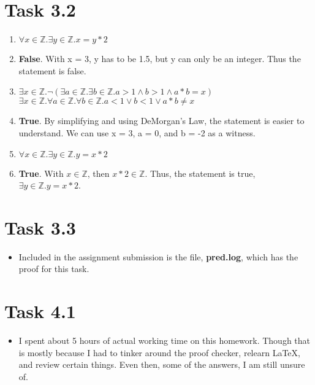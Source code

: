 \documentclass{article}
\newcommand{\Z}{\mathbb{Z}}
\newcommand{\answer}{\item[]} %
\begin{document}
	\section{Task 3.2}
		\begin{enumerate}[label = {(\alph*)}]
			
			\item $\forall x \in \Z . \exists y \in \Z . x = y * 2$
			\answer \textbf{False}. With x = 3, y has to be 1.5, but y can only be an integer. Thus the statement is false.
			
			\item $\exists x \in \Z . \neg(\exists a \in \Z . \exists b \in \Z . a > 1 \land b > 1 \land a * b = x)$
			\newline
			$\exists x \in \Z . \forall a \in \Z . \forall b \in \Z . a < 1 \lor b < 1 \lor a * b \neq x$
			\answer \textbf{True}. By simplifying and using DeMorgan's Law, the statement is easier to understand. We can use x = 3, a = 0, and b = -2 as a witness. 
			
			\item $\forall x \in \Z . \exists y \in \Z . y = x * 2$
			\answer \textbf{True}. With $x \in \Z$, then $x * 2 \in \Z$. Thus, the statement is true, $\exists y \in \Z . y = x * 2$.
			
		\end{enumerate}
	
	\section{Task 3.3}
		\begin{itemize}
			
			\answer Included in the assignment submission is the file, \textbf{pred.log}, which has the proof for this task.
			
		\end{itemize}
	
	\section{Task 4.1}
		\begin{itemize}
			
			\answer I spent about 5 hours of actual working time on this homework. Though that is mostly because I had to tinker around the proof checker, relearn LaTeX, and review certain things. Even then, some of the answers, I am still unsure of.
			
		\end{itemize}
	
\end{document}
